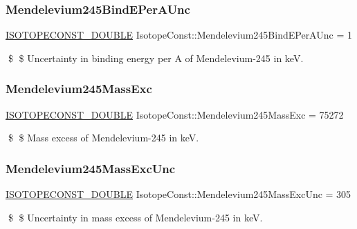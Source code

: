 \subsubsection{\texorpdfstring{Mendelevium245\+Bind\+E\+Per\+A\+Unc}{Mendelevium245BindEPerAUnc}}
{\footnotesize\ttfamily \mbox{\hyperlink{group___isotope_const-_macros_ga8f45a7272ce02c0b4c65c44636ed719a}{I\+S\+O\+T\+O\+P\+E\+C\+O\+N\+S\+T\+\_\+\+D\+O\+U\+B\+LE}} Isotope\+Const\+::\+Mendelevium245\+Bind\+E\+Per\+A\+Unc = 1}

\$ \$ Uncertainty in binding energy per A of Mendelevium-\/245 in keV. \mbox{\label{group___isotope_const-_mendelevium-_md245_gabc759b583a61c4e429667389740dde7f}} 
\subsubsection{\texorpdfstring{Mendelevium245\+Mass\+Exc}{Mendelevium245MassExc}}
{\footnotesize\ttfamily \mbox{\hyperlink{group___isotope_const-_macros_ga8f45a7272ce02c0b4c65c44636ed719a}{I\+S\+O\+T\+O\+P\+E\+C\+O\+N\+S\+T\+\_\+\+D\+O\+U\+B\+LE}} Isotope\+Const\+::\+Mendelevium245\+Mass\+Exc = 75272}

\$ \$ Mass excess of Mendelevium-\/245 in keV. \mbox{\label{group___isotope_const-_mendelevium-_md245_gac8f0fe063a56e6e801e653811ef528bf}} 
\subsubsection{\texorpdfstring{Mendelevium245\+Mass\+Exc\+Unc}{Mendelevium245MassExcUnc}}
{\footnotesize\ttfamily \mbox{\hyperlink{group___isotope_const-_macros_ga8f45a7272ce02c0b4c65c44636ed719a}{I\+S\+O\+T\+O\+P\+E\+C\+O\+N\+S\+T\+\_\+\+D\+O\+U\+B\+LE}} Isotope\+Const\+::\+Mendelevium245\+Mass\+Exc\+Unc = 305}

\$ \$ Uncertainty in mass excess of Mendelevium-\/245 in keV. \mbox{\label{group___isotope_const-_mendelevium-_md245_gaf6d702b3f6d6c8c738aa31ececd68d5a}} 
